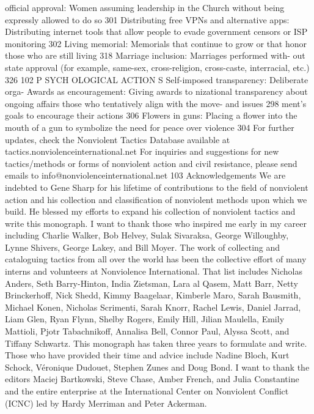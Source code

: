\documentclass[twoside,a4paper,12pt,fleqn,openany]{extbook}
\begin{document}
official approval: Women assuming leadership
in the Church without being expressly allowed
to do so
 301
Distributing free VPNs and alternative
apps: Distributing internet tools that allow
people to evade government censors or ISP
monitoring
 302
Living memorial: Memorials that continue to
grow or that honor those who are still living		
318
Marriage inclusion: Marriages performed with-
out state approval (for example, same-sex,
cross-religion, cross-caste, interracial, etc.)		
326
102
P SYCH OLOGICAL ACTION S
Self-imposed transparency: Deliberate orga-
 Awards as encouragement: Giving awards to
nizational transparency about ongoing affairs
 those who tentatively align with the move-
and issues
 298
 ment’s goals to encourage their actions 306
Flowers in guns: Placing a flower into the
mouth of a gun to symbolize the need for
peace over violence
 304
For further updates, check the Nonviolent Tactics Database available at
tactics.nonviolenceinternational.net
For inquiries and suggestions for new tactics/methods or forms of nonviolent action
and civil resistance, please send emails to info@nonviolenceinternational.net
103
Acknowledgements
We are indebted to Gene Sharp for his lifetime of contributions to the field of nonviolent action and his
collection and classification of nonviolent methods upon which we build. He blessed my efforts to expand
his collection of nonviolent tactics and write this monograph.
I want to thank those who inspired me early in my career including Charlie Walker, Bob Helvey, Sulak Sivaraksa,
George Willoughby, Lynne Shivers, George Lakey, and Bill Moyer.
The work of collecting and cataloguing tactics from all over the world has been the collective effort of many
interns and volunteers at Nonviolence International.
That list includes Nicholas Anders, Seth Barry-Hinton, India Zietsman, Lara al Qasem, Matt Barr, Netty Brinckerhoff,
Nick Shedd, Kimmy Baagelaar, Kimberle Maro, Sarah Bausmith, Michael Konen, Nicholas Scrimenti, Sarah Knorr,
Rachel Lewis, Daniel Jarrad, Liam Glen, Ryan Flynn, Shelby Rogers, Emily Hill, Jilian Maulella, Emily Mattioli, Pjotr
Tabachnikoff, Annalisa Bell, Connor Paul, Alyssa Scott, and Tiffany Schwartz.
This monograph has taken three years to formulate and write. Those who have provided their time and advice
include Nadine Bloch, Kurt Schock, Véronique Dudouet, Stephen Zunes and Doug Bond.
I want to thank the editors Maciej Bartkowski, Steve Chase, Amber French, and Julia Constantine and the entire
enterprise at the International Center on Nonviolent Conflict (ICNC) led by Hardy Merriman and Peter Ackerman.
\end{document}
